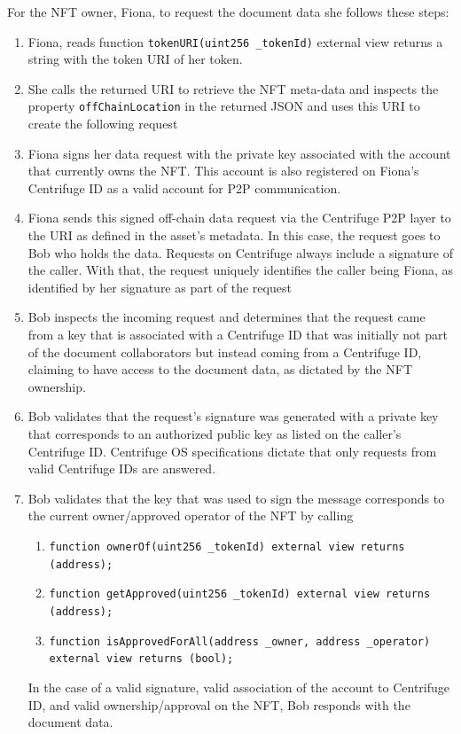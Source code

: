 \documentclass[a4paper, 10pt]{article}
\begin{document}
For the NFT owner, Fiona, to request the document data she follows these steps:
\begin{enumerate}
    \item Fiona, reads function \texttt{tokenURI(uint256 \_tokenId)} external view returns a string with the token URI of her token.
    \item She calls the returned URI to retrieve the NFT meta-data and inspects the property \texttt{offChainLocation} in the returned JSON and uses this URI to create the following request
    \item Fiona signs her data request with the private key associated with the account that currently owns the NFT. This account is also registered on Fiona’s Centrifuge ID as a valid account for P2P communication.
    \item Fiona sends this signed off-chain data request via the Centrifuge P2P layer to the URI as defined in the asset’s metadata. In this case, the request goes to Bob who holds the data. Requests on Centrifuge always include a signature of the caller. With that, the request uniquely identifies the caller being Fiona, as identified by her signature as part of the request
    \item Bob inspects the incoming request and determines that the request came from a key that is associated with a Centrifuge ID that was initially not part of the document collaborators but instead coming from a Centrifuge ID, claiming to have access to the document data, as dictated by the NFT ownership.
    \item Bob validates that the request’s signature was generated with a private key that corresponds to an authorized public key as listed on the caller’s Centrifuge ID. Centrifuge OS specifications dictate that only requests from valid Centrifuge IDs are answered.
    \item Bob validates that the key that was used to sign the message corresponds to the current owner/approved operator of the NFT by calling
        \begin{enumerate}
            \item \texttt{function ownerOf(uint256 \_tokenId) external view returns (address);}
            \item \texttt{function getApproved(uint256 \_tokenId) external view returns (address);}
            \item \texttt{function isApprovedForAll(address \_owner, address \_operator) external view returns (bool);}
        \end{enumerate}
    In the case of a valid signature, valid association of the account to Centrifuge ID, and valid ownership/approval on the NFT, Bob responds with the document data.

\end{enumerate}
\end{document}
